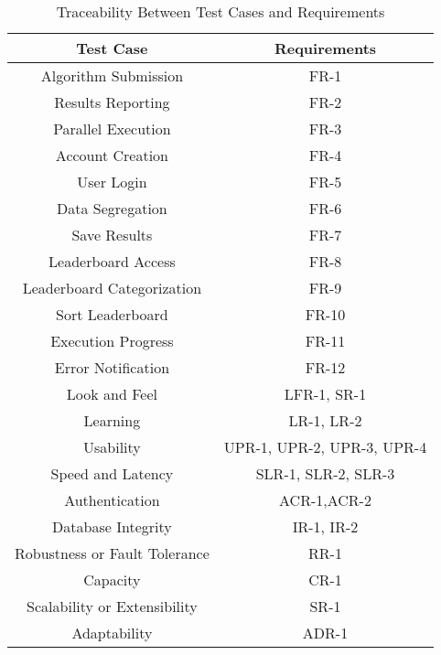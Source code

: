 \documentclass[12pt, titlepage]{article}
\begin{document}
\begin{table}[H]
    \centering
    \caption{Traceability Between Test Cases and Requirements} \label{TblTraceability}
    \begin{tabular}{|c|c|}
        \hline
        \textbf{Test Case} & \textbf{Requirements} \\ 
        \hline
        Algorithm Submission & FR-1 \\ 
        \hline
        Results Reporting & FR-2 \\ 
         \hline
        Parallel Execution & FR-3 \\ 
         \hline
        Account Creation & FR-4 \\ 
        \hline
        User Login & FR-5 \\ 
         \hline
        Data Segregation & FR-6 \\ 
        \hline
        Save Results & FR-7 \\ 
         \hline
        Leaderboard Access & FR-8 \\ 
         \hline
        Leaderboard Categorization & FR-9 \\ 
         \hline
        Sort Leaderboard & FR-10 \\ 
         \hline
        Execution Progress & FR-11 \\ 
         \hline
        Error Notification & FR-12 \\ 
         \hline
        Look and Feel & LFR-1, SR-1 \\ 
         \hline
        Learning & LR-1, LR-2 \\
         \hline
        Usability & UPR-1, UPR-2, UPR-3, UPR-4 \\ 
         \hline
        Speed and Latency & SLR-1, SLR-2, SLR-3 \\ 
         \hline
        Authentication & ACR-1,ACR-2 \\
         \hline
        Database Integrity & IR-1, IR-2 \\ 
         \hline
        Robustness or Fault Tolerance & RR-1 \\ 
         \hline
        Capacity & CR-1 \\
         \hline
        Scalability or Extensibility & SR-1 \\
         \hline
        Adaptability & ADR-1 \\
        \hline
        
    \end{tabular}
\end{table}
\end{document}
